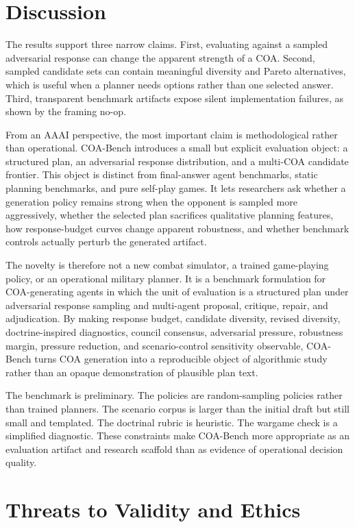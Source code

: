 \documentclass[letterpaper]{article}
\begin{document}
\section{Discussion}

The results support three narrow claims. First, evaluating against a sampled adversarial response can change the apparent strength of a COA. Second, sampled candidate sets can contain meaningful diversity and Pareto alternatives, which is useful when a planner needs options rather than one selected answer. Third, transparent benchmark artifacts expose silent implementation failures, as shown by the framing no-op.

From an AAAI perspective, the most important claim is methodological rather than operational. COA-Bench introduces a small but explicit evaluation object: a structured plan, an adversarial response distribution, and a multi-COA candidate frontier. This object is distinct from final-answer agent benchmarks, static planning benchmarks, and pure self-play games. It lets researchers ask whether a generation policy remains strong when the opponent is sampled more aggressively, whether the selected plan sacrifices qualitative planning features, how response-budget curves change apparent robustness, and whether benchmark controls actually perturb the generated artifact.

The novelty is therefore not a new combat simulator, a trained game-playing policy, or an operational military planner. It is a benchmark formulation for COA-generating agents in which the unit of evaluation is a structured plan under adversarial response sampling and multi-agent proposal, critique, repair, and adjudication. By making response budget, candidate diversity, revised diversity, doctrine-inspired diagnostics, council consensus, adversarial pressure, robustness margin, pressure reduction, and scenario-control sensitivity observable, COA-Bench turns COA generation into a reproducible object of algorithmic study rather than an opaque demonstration of plausible plan text.

The benchmark is preliminary. The policies are random-sampling policies rather than trained planners. The scenario corpus is larger than the initial draft but still small and templated. The doctrinal rubric is heuristic. The wargame check is a simplified diagnostic. These constraints make COA-Bench more appropriate as an evaluation artifact and research scaffold than as evidence of operational decision quality.

\section{Threats to Validity and Ethics}
\end{document}
